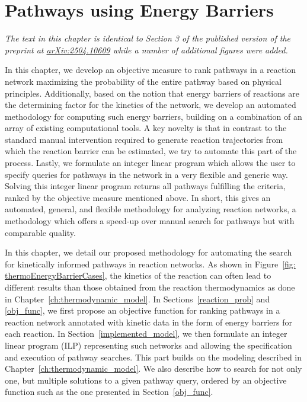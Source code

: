 \chapter{Pathways using Energy Barriers}
\label{ch:refined_model} %

{\sffamily\slshape The text in this chapter is identical to Section 3 of the published version of the preprint at \href{https://arxiv.org/abs/2504.10609}{arXiv:2504.10609} while a number of additional figures were added.\\}

In this chapter, we develop an objective measure to rank pathways in a reaction network maximizing the probability of the entire pathway based on physical principles. 
Additionally, based on the notion that energy barriers of reactions are the determining factor for the kinetics of the network, we develop an automated methodology for computing such energy barriers, building on a combination of an array of existing computational tools. A key novelty is that in contrast to the standard manual intervention required to generate reaction trajectories from which the reaction barrier can be estimated, we try to automate this part of the process.
Lastly, we formulate an integer linear program which allows the user to specify queries for pathways in the network in a very flexible and generic way. Solving this integer linear program returns all pathways fulfilling the criteria, ranked by the objective measure mentioned above.
In short, this gives an automated, general, and flexible methodology for analyzing reaction networks, a methodology which offers a speed-up over manual search for pathways but with comparable quality.

In this chapter, we detail our proposed methodology for automating the search for kinetically informed pathways in reaction networks. As shown in Figure~\ref{fig: thermoEnergyBarrierCases}, the kinetics of the reaction can often lead to different results than those obtained from the reaction thermodynamics as done in Chapter~\ref{ch:thermodynamic_model}. In Sections~\ref{reaction_prob} and \ref{obj_func}, we first propose an objective function for ranking pathways in a reaction network annotated with kinetic data in the form of energy barriers for each reaction. In Section~\ref{implemented_model}, we then formulate an integer linear program (ILP) representing such networks and allowing the specification and execution of pathway searches. This part builds on the modeling described in Chapter~\ref{ch:thermodynamic_model}. We also describe how to search for not only one, but multiple solutions to a given pathway query, ordered by an objective function such as the one presented in Section~\ref{obj_func}. 

